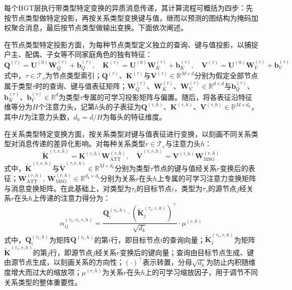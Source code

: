 每个HGT层执行带类型特定变换的异质消息传递，其计算流程可概括为四步：先按节点类型做特定投影，再按关系类型变换键与值，继而以预测的图结构为掩码加权聚合消息，最后按节点类型做输出变换。下面依次阐述。
 
在节点类型特定投影方面，为每种节点类型定义独立的查询、键与值投影，以捕捉户主、配偶、子女等不同家庭角色的独有特征：
\begin{equation}
  \mathbf{Q}^{(\tau)} = \mathbf{U}^{(0)} \mathbf{W}_Q^{(\tau)} + \mathbf{b}_Q^{(\tau)}, \quad
  \mathbf{K}^{(\tau)} = \mathbf{U}^{(0)} \mathbf{W}_K^{(\tau)} + \mathbf{b}_K^{(\tau)}, \quad
  \mathbf{V}^{(\tau)} = \mathbf{U}^{(0)} \mathbf{W}_V^{(\tau)} + \mathbf{b}_V^{(\tau)}
  \label{eq.popsyn.hgtqkv}
\end{equation}
式中，$\tau \in \mathcal{T}_v$为节点类型索引；$\mathbf{Q}^{(\tau)}$、$\mathbf{K}^{(\tau)}$与$\mathbf{V}^{(\tau)} \in \mathbb{R}^{M \times d}$分别为假定全部节点属于类型$\tau$时的查询、键与值表征矩阵；$\mathbf{W}_Q^{(\tau)}$、$\mathbf{W}_K^{(\tau)}$、$\mathbf{W}_V^{(\tau)} \in \mathbb{R}^{d \times d}$与$\mathbf{b}_Q^{(\tau)}$、$\mathbf{b}_K^{(\tau)}$、$\mathbf{b}_V^{(\tau)} \in \mathbb{R}^{d}$为类型$\tau$专属的可学习投影矩阵与偏置。随后，将各表征沿特征维等分为$H$个注意力头，记第$h$头的子表征为$\mathbf{Q}^{(\tau, h)}$、$\mathbf{K}^{(\tau, h)}$、$\mathbf{V}^{(\tau, h)} \in \mathbb{R}^{M \times d_k}$，其中$H$为注意力头数，$d_k = d / H$为每头的特征维度。
 
在关系类型特定变换方面，按关系类型对键与值表征进行变换，以刻画不同关系类型对消息传递的差异化影响。对每种关系类型$r \in \mathcal{T}_e$与注意力头$h$：
\begin{equation}
  \tilde{\mathbf{K}}^{(\tau, r, h)} = \mathbf{K}^{(\tau, h)} \mathbf{W}_{\mathrm{ATT}}^{(r, h)}, \quad
  \tilde{\mathbf{V}}^{(\tau, r, h)} = \mathbf{V}^{(\tau, h)} \mathbf{W}_{\mathrm{MSG}}^{(r, h)}
  \label{eq.popsyn.hgtrel}
\end{equation}
式中，$\tilde{\mathbf{K}}^{(\tau, r, h)}$与$\tilde{\mathbf{V}}^{(\tau, r, h)} \in \mathbb{R}^{M \times d_k}$分别为类型$\tau$节点的键与值经关系$r$变换后的表征；$\mathbf{W}_{\mathrm{ATT}}^{(r, h)},\, \mathbf{W}_{\mathrm{MSG}}^{(r, h)} \in \mathbb{R}^{d_k \times d_k}$分别为关系$r$在头$h$上专属的可学习注意力变换矩阵与消息变换矩阵。在此基础上，对类型为$\tau_t$的目标节点$i$，类型为$\tau_s$的源节点$j$经关系$r$在头$h$上传递的注意力得分为：
\begin{equation}
  \alpha_{ij}^{(\tau_s, \tau_t, r, h)} = \frac{\mathbf{Q}_i^{(\tau_t, h)} \cdot \left(\tilde{\mathbf{K}}_j^{(\tau_s, r, h)}\right)^{\top}}{\sqrt{d_k}} \cdot \mu^{(r, h)}
  \label{eq.popsyn.hgtatt}
\end{equation}
式中，$\mathbf{Q}_i^{(\tau_t, h)}$为矩阵$\mathbf{Q}^{(\tau_t, h)}$的第$i$行，即目标节点$i$的查询向量；$\tilde{\mathbf{K}}_j^{(\tau_s, r, h)}$为矩阵$\tilde{\mathbf{K}}^{(\tau_s, r, h)}$的第$j$行，即源节点$j$经关系$r$变换后的键向量；查询由目标节点生成、键由源节点生成，以刻画关系的方向性；$(\cdot)^{\top}$表示转置，分母$\sqrt{d_k}$为防止内积随维度增大而过大的缩放项；$\mu^{(r, h)}$为关系$r$在头$h$上的可学习缩放因子，用于调节不同关系类型的整体重要性。
 
